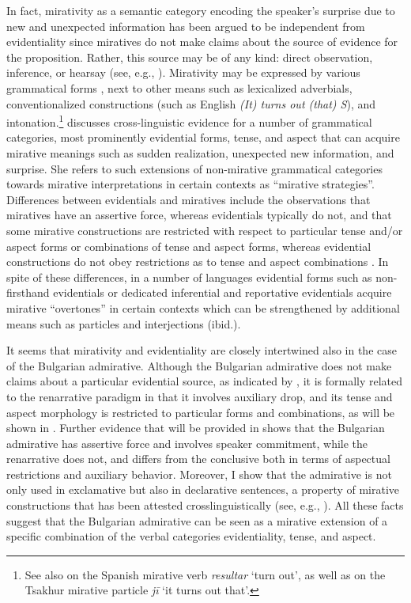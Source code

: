 \documentclass[output=paper,
colorlinks,
citecolor=brown,
newtxmath
]{langscibook}
\begin{document}
In fact, mirativity as a semantic category encoding the speaker's surprise due to new and unexpected information has been argued to be independent from evidentiality since miratives do not make claims about the source of evidence for the proposition. Rather, this source may be of any kind: direct observation, inference, or hearsay (see, e.g., \citealt{Jacobsen1964,Watters2002}). Mirativity may be expressed by various grammatical forms \citep{DeLancey1997,DeLancey2001,DeLancey2012}, next to other means such as lexicalized adverbials, conventionalized constructions (such as English \textit{(It) turns out (that) S}), and intonation.\footnote{See also \citet[160]{Bustamante2013} on the Spanish mirative verb \textit{resultar} `turn out', as well as \citet[290]{TatevosovMaisak1999} on the Tsakhur mirative particle \textit{jī} `it turns out that'.} \citet{Aikhenvald2012} discusses cross-linguistic evidence for a number of grammatical categories, most prominently evidential forms, tense, and aspect that can acquire mirative meanings such as sudden realization, unexpected new information, and surprise. She refers to such extensions of non-mirative grammatical categories towards mirative interpretations in certain contexts as ``mirative strategies''. Differences between evidentials and miratives include the observations that miratives have an assertive force, whereas evidentials typically do not, and that some mirative constructions are restricted with respect to particular tense and/or aspect forms or combinations of tense and aspect forms, whereas evidential constructions do not obey restrictions as to tense and aspect combinations \citep[441]{Aikhenvald2012}.
In spite of these differences, in a number of languages evidential forms such as non-firsthand evidentials or dedicated inferential and reportative evidentials acquire mirative ``overtones'' in certain contexts which can be strengthened by additional means such as particles and interjections (ibid.).

It seems that mirativity and evidentiality are closely intertwined also in the case of the Bulgarian admirative. Although the Bulgarian admirative does not make claims about a particular evidential source, as indicated by , it is formally related to the renarrative paradigm in that it involves auxiliary drop, and its tense and aspect morphology is restricted to particular forms and combinations, as will be shown in . Further evidence that will be provided in  shows that the Bulgarian admirative has assertive force and involves speaker commitment, while the renarrative does not, and differs from the conclusive both in terms of aspectual restrictions and auxiliary behavior. Moreover, I show that the admirative is not only used in exclamative but also in declarative sentences, a property of mirative constructions that has been attested crosslinguistically (see, e.g., \citealt{Bustamante2013}). All these facts suggest that the Bulgarian admirative can be seen as a mirative extension of a specific combination of the verbal categories evidentiality, tense, and aspect.
\end{document}
